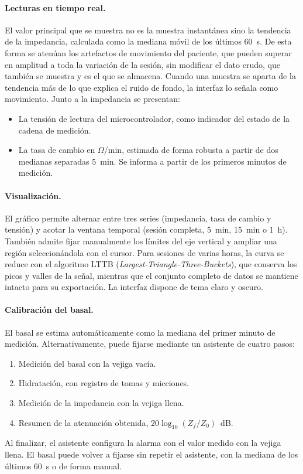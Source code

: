 \documentclass[12pt,a4paper]{article}
\begin{document}
\paragraph{Lecturas en tiempo real.} El valor principal que se muestra no es la muestra instantánea sino la tendencia de la impedancia, calculada como la mediana móvil de los últimos 60~s. De esta forma se atenúan los artefactos de movimiento del paciente, que pueden superar en amplitud a toda la variación de la sesión, sin modificar el dato crudo, que también se muestra y es el que se almacena. Cuando una muestra se aparta de la tendencia más de lo que explica el ruido de fondo, la interfaz lo señala como movimiento. Junto a la impedancia se presentan:
\begin{itemize}
    \item La tensión de lectura del microcontrolador, como indicador del estado de la cadena de medición.
    \item La tasa de cambio en $\Omega$/min, estimada de forma robusta a partir de dos medianas separadas 5~min. Se informa a partir de los primeros minutos de medición.
\end{itemize}

\paragraph{Visualización.} El gráfico permite alternar entre tres series (impedancia, tasa de cambio y tensión) y acotar la ventana temporal (sesión completa, 5~min, 15~min o 1~h). También admite fijar manualmente los límites del eje vertical y ampliar una región seleccionándola con el cursor. Para sesiones de varias horas, la curva se reduce con el algoritmo LTTB (\textit{Largest-Triangle-Three-Buckets}), que conserva los picos y valles de la señal, mientras que el conjunto completo de datos se mantiene intacto para su exportación. La interfaz dispone de tema claro y oscuro.

\paragraph{Calibración del basal.} El basal se estima automáticamente como la mediana del primer minuto de medición. Alternativamente, puede fijarse mediante un asistente de cuatro pasos:
\begin{enumerate}
    \item Medición del basal con la vejiga vacía.
    \item Hidratación, con registro de tomas y micciones.
    \item Medición de la impedancia con la vejiga llena.
    \item Resumen de la atenuación obtenida, $20\log_{10}(Z_f/Z_0)$~dB.
\end{enumerate}
Al finalizar, el asistente configura la alarma con el valor medido con la vejiga llena. El basal puede volver a fijarse sin repetir el asistente, con la mediana de los últimos 60~s o de forma manual.
\end{document}
